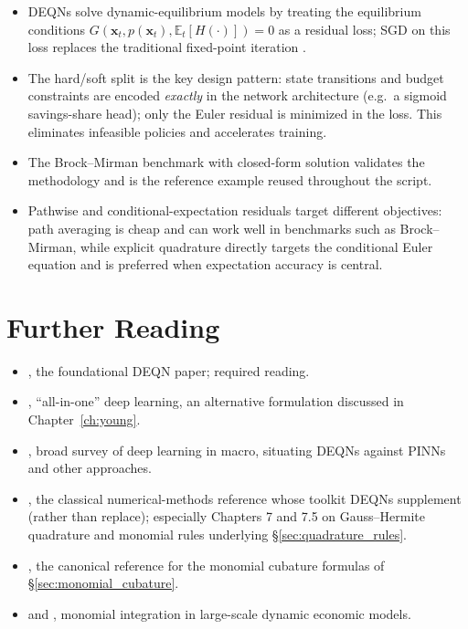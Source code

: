 \documentclass[11pt,a4paper]{report}
\newcommand{\x}{\bm{x}}
\begin{document}
\begin{keyinsightbox}
\begin{itemize}[itemsep=2pt, leftmargin=*]
\item DEQNs solve dynamic-equilibrium models by treating the equilibrium conditions $G(\x_t, p(\x_t), \mathbb{E}_t[H(\cdot)]) = 0$ as a residual loss; SGD on this loss replaces the traditional fixed-point iteration \citep{azinovicDEEPEQUILIBRIUMNETS2022}.
\item The hard/soft split is the key design pattern: state transitions and budget constraints are encoded \emph{exactly} in the network architecture (e.g.\ a sigmoid savings-share head); only the Euler residual is minimized in the loss.  This eliminates infeasible policies and accelerates training.
\item The Brock--Mirman benchmark with closed-form solution validates the methodology and is the reference example reused throughout the script.
\item Pathwise and conditional-expectation residuals target different objectives: path averaging is cheap and can work well in benchmarks such as Brock--Mirman, while explicit quadrature directly targets the conditional Euler equation and is preferred when expectation accuracy is central.
\end{itemize}
\end{keyinsightbox}

\section*{Further Reading}
\begin{itemize}[itemsep=2pt]
\item \citet{azinovicDEEPEQUILIBRIUMNETS2022}, the foundational DEQN paper; required reading.
\item \citet{maliar2021deep}, ``all-in-one'' deep learning, an alternative formulation discussed in Chapter~\ref{ch:young}.
\item \citet{fernandezvillaverde2024taming}, broad survey of deep learning in macro, situating DEQNs against PINNs and other approaches.
\item \citet{judd1998numerical}, the classical numerical-methods reference whose toolkit DEQNs supplement (rather than replace); especially Chapters 7 and 7.5 on Gauss--Hermite quadrature and monomial rules underlying \S\ref{sec:quadrature_rules}.
\item \citet{stroud1971approximate}, the canonical reference for the monomial cubature formulas of \S\ref{sec:monomial_cubature}.
\item \citet{pichler2011} and \citet{Maliar2014325}, monomial integration in large-scale dynamic economic models.
\end{itemize}
\end{document}
